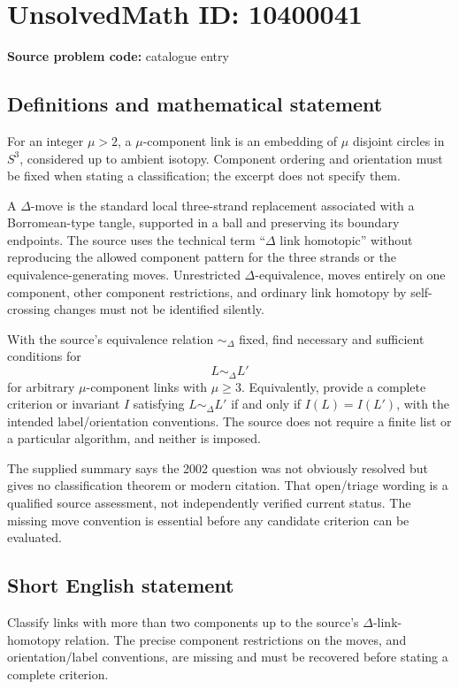 \documentclass[11pt]{article}
\begin{document}
\section*{UnsolvedMath ID: 10400041}
\textbf{Source problem code:} catalogue entry
\subsection{Definitions and mathematical statement}
For an integer \(\mu>2\), a \(\mu\)-component link is an embedding of \(\mu\) disjoint circles in \(S^3\), considered up to ambient isotopy. Component ordering and orientation must be fixed when stating a classification; the excerpt does not specify them.

A \(\Delta\)-move is the standard local three-strand replacement associated with a Borromean-type tangle, supported in a ball and preserving its boundary endpoints. The source uses the technical term ``\(\Delta\) link homotopic'' without reproducing the allowed component pattern for the three strands or the equivalence-generating moves. Unrestricted \(\Delta\)-equivalence, moves entirely on one component, other component restrictions, and ordinary link homotopy by self-crossing changes must not be identified silently.

With the source's equivalence relation \(\sim_\Delta\) fixed, find necessary and sufficient conditions for
\[
 L\sim_\Delta L'
\]
for arbitrary \(\mu\)-component links with \(\mu\ge3\). Equivalently, provide a complete criterion or invariant \(I\) satisfying \(L\sim_\Delta L'\) if and only if \(I(L)=I(L')\), with the intended label/orientation conventions. The source does not require a finite list or a particular algorithm, and neither is imposed.

The supplied summary says the 2002 question was not obviously resolved but gives no classification theorem or modern citation. That open/triage wording is a qualified source assessment, not independently verified current status. The missing move convention is essential before any candidate criterion can be evaluated.
\subsection{Short English statement}
Classify links with more than two components up to the source's \(\Delta\)-link-homotopy relation. The precise component restrictions on the moves, and orientation/label conventions, are missing and must be recovered before stating a complete criterion.
\end{document}
